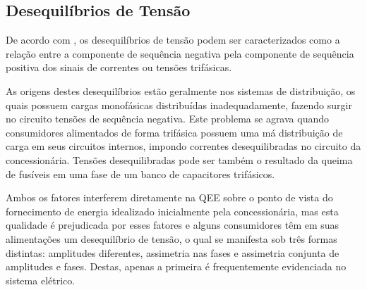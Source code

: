 \subsection{Desequilíbrios de Tensão}
\par
De acordo com \cite{DUG96}, os desequilíbrios de tensão podem ser caracterizados como a relação entre a componente de sequência negativa pela componente de sequência positiva dos sinais de correntes ou tensões trifásicas.
\par
As origens destes desequilíbrios estão geralmente nos sistemas de distribuição, os quais possuem cargas monofásicas distribuídas inadequadamente, fazendo surgir no circuito tensões de sequência negativa. Este problema se agrava quando consumidores alimentados de forma trifásica possuem uma má distribuição de carga em seus circuitos internos, impondo correntes desequilibradas no circuito da concessionária. Tensões desequilibradas pode ser também o resultado da queima de fusíveis em uma fase de um banco de capacitores trifásicos.
\par
Ambos os fatores interferem diretamente na QEE sobre o ponto de vista do fornecimento de energia idealizado inicialmente pela concessionária, mas esta qualidade é prejudicada por esses fatores e alguns consumidores têm em suas alimentações um desequilíbrio de tensão, o qual se manifesta sob três formas distintas: amplitudes diferentes, assimetria nas fases e assimetria conjunta de amplitudes e fases. Destas, apenas a primeira é frequentemente evidenciada no sistema elétrico.

